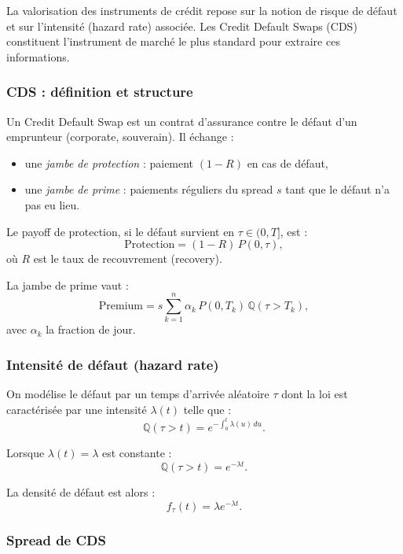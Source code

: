 \documentclass[11pt,a4paper]{article}
\newcommand{\1}{\mathbf{1}}
\begin{document}
La valorisation des instruments de cr\'edit repose sur la notion de risque de
d\'efaut et sur l'intensit\'e (hazard rate) associ\'ee. Les Credit Default Swaps
(CDS) constituent l'instrument de march\'e le plus standard pour extraire ces
informations.

\subsubsection{CDS : d\'efinition et structure}

Un Credit Default Swap est un contrat d'assurance contre le d\'efaut d'un
emprunteur (corporate, souverain). Il \'{e}change :
\begin{itemize}
  \item une \emph{jambe de protection} : paiement $(1 - R)$ en cas de d\'efaut,
  \item une \emph{jambe de prime} : paiements r\'eguliers du spread $s$ tant que
        le d\'efaut n'a pas eu lieu.
\end{itemize}

Le payoff de protection, si le d\'efaut survient en $\tau \in (0,T]$, est :
\[
\mathrm{Protection}
= (1 - R)\, P(0,\tau),
\]
o\`u $R$ est le taux de recouvrement (recovery).

La jambe de prime vaut :
\[
\mathrm{Premium}
=
s \sum_{k=1}^{n}
\alpha_k\, P(0,T_k)\, \mathbb{Q}(\tau > T_k),
\]
avec $\alpha_k$ la fraction de jour.

\subsubsection{Intensit\'e de d\'efaut (hazard rate)}

On mod\'elise le d\'efaut par un temps d'arriv\'ee al\'eatoire $\tau$ dont la
loi est caract\'eris\'ee par une intensit\'e $\lambda(t)$ telle que :
\[
\mathbb{Q}(\tau > t)
= e^{-\int_0^t \lambda(u)\, du}.
\]

Lorsque $\lambda(t) = \lambda$ est constante :
\[
\mathbb{Q}(\tau > t) = e^{-\lambda t}.
\]

La densit\'e de d\'efaut est alors :
\[
f_\tau(t) = \lambda e^{-\lambda t}.
\]

\subsubsection{Spread de CDS}
\end{document}
